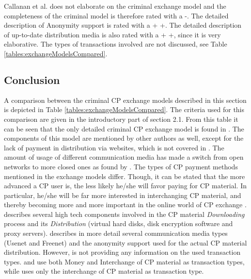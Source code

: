 \documentclass{sig-alternate-br}
\begin{document}
Callanan et al. does not elaborate on the criminal exchange model and the completeness of the criminal model is therefore rated with a -. The detailed description of Anonymity support is rated with a + +. The detailed description of up-to-date distribution media is also rated with a + +, since it is very elaborative. The types of transactions involved are not discussed, see Table \ref{tables:exchangeModelsCompared}.

\subsection{Conclusion}
A comparison between the criminal CP exchange models described in this section is depicted in Table \ref{tables:exchangeModelsCompared}. The criteria used for this comparison are given in the introductory part of section 2.1.
From this table it can be seen that the only detailed criminal CP exchange model is found in \cite{en2011phishing}. The components of this model are mentioned by other authors as well, except for the lack of payment in distribution via websites, which is not covered in \cite{en2011phishing}. The amount of usage of different communication media has made a switch from open networks to more closed ones as found by \cite{wortley2006child,wijk2009achter}. The types of CP payment methods mentioned in the exchange models differ. Though, it can be stated that the more advanced a CP user is, the less likely he/she will favor paying for CP material. In particular, he/she will be far more interested in interchanging CP material, and thereby becoming more and more important in the online world of CP exchange \cite{wijk2009achter,quayle2002paedophiles,krone2005international,en2011phishing}. \cite{wijk2009achter} describes several high tech components involved in the CP material \textit{Downloading} process and its \textit{Distribution} (virtual hard disks, disk encryption software and proxy servers). \cite{callanan2009internet} describes in more detail several communication media types (Usenet and Freenet) and the anonymity support used for the actual CP material distribution. However, \cite{callanan2009internet} is not providing any information on the used transaction types. \cite{en2011phishing} and \cite{wijk2009achter} use both Money and Interchange of CP material as transaction types, while \cite{wortley2006child} uses only the interchange of CP material as transaction type.
\end{document}
